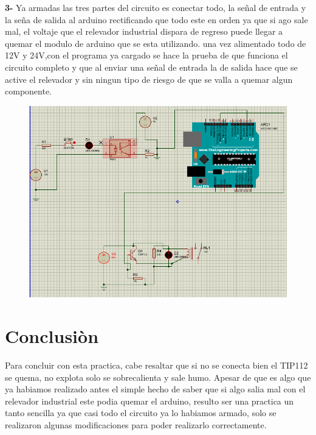 \documentclass[12pt,a4paper]{article}
\begin{document}
\textbf{3-} Ya armadas las tres partes del circuito es conectar todo, la señal de entrada y la seña de salida al arduino rectificando que todo este en orden ya que si ago sale mal, el voltaje que el relevador industrial dispara de regreso puede llegar a quemar el modulo de arduino que se esta utilizando. una vez alimentado todo de 12V y 24V,con el programa ya cargado se hace la prueba de que funciona el circuito completo y que al enviar una señal de entrada la de salida hace que se active el relevador y sin ningun tipo de riesgo de que se valla a quemar algun componente.
\begin{figure}[h!]
\centering
\includegraphics[scale=1]{Captura2.PNG} 
\end{figure}
\section{Conclusiòn}
Para concluir con esta practica, cabe resaltar que si no se conecta bien el TIP112 se quema, no explota solo se sobrecalienta y sale humo. Apesar de que es algo que ya habiamos realizado antes el simple hecho de saber que si algo salia mal con el relevador industrial este podia quemar el arduino, resulto ser una practica un tanto sencilla ya que casi todo el circuito ya lo habiamos armado, solo se realizaron algunas modificaciones para poder realizarlo correctamente. 
\end{document}
